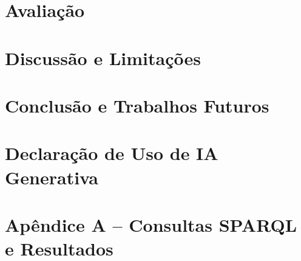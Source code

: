 \documentclass[12pt]{article}
\begin{document}
\section{Avaliação}
\label{sec:avaliacao}

\section{Discussão e Limitações}
\label{sec:discussao}

\section{Conclusão e Trabalhos Futuros}
\label{sec:conclusao}

\section*{Declaração de Uso de IA Generativa}
\label{sec:declaracao-ia}

\nocite{*}



\section*{Apêndice A -- Consultas SPARQL e Resultados}
\label{sec:apendice-sparql}
\end{document}
